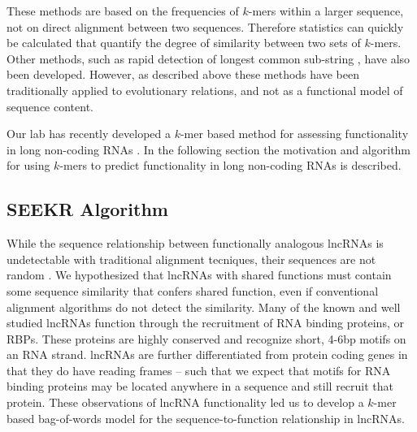 These methods are based on the frequencies of $k$-mers within a larger sequence, not on direct alignment between two sequences. Therefore statistics can quickly be calculated that quantify the degree of similarity between two sets of $k$-mers. Other methods, such as rapid detection of longest common sub-string \cite{Ulitsky2006TheReconstruction}, have also been developed. However, as described above these methods have been traditionally applied to evolutionary relations, and not as a functional model of sequence content. 

Our lab has recently developed a $k$-mer based method for assessing functionality in long non-coding RNAs \cite{Kirk2018FunctionalContent}. In the following section the motivation and algorithm for using $k$-mers to predict functionality in long non-coding RNAs is described. 

\subsection{SEEKR Algorithm}

 While the sequence relationship between functionally analogous lncRNAs is undetectable with traditional alignment tecniques, their sequences are not random \cite{Brown10TheNucleus.,Brockdorff2018LocalNcRNA,Kirk2018FunctionalContent,Sprague2019NonlinearDomains,Wang2017TargetingGuanines,Zhao2008PolycombChromosome,Pintacuda2017HnRNPKSilencing}. We hypothesized that lncRNAs with shared functions must contain some sequence similarity that confers shared function, even if conventional alignment algorithms do not detect the similarity. Many of the known and well studied lncRNAs function through the recruitment of RNA binding proteins, or RBPs. These proteins are highly conserved and recognize short, 4-6bp motifs on an RNA strand. lncRNAs are further differentiated from protein coding genes in that they do have reading frames -- such that we expect that motifs for RNA binding proteins may be located anywhere in a sequence and still recruit that protein. These observations of lncRNA functionality led us to develop a $k$-mer based bag-of-words model for the sequence-to-function relationship in lncRNAs.
 
